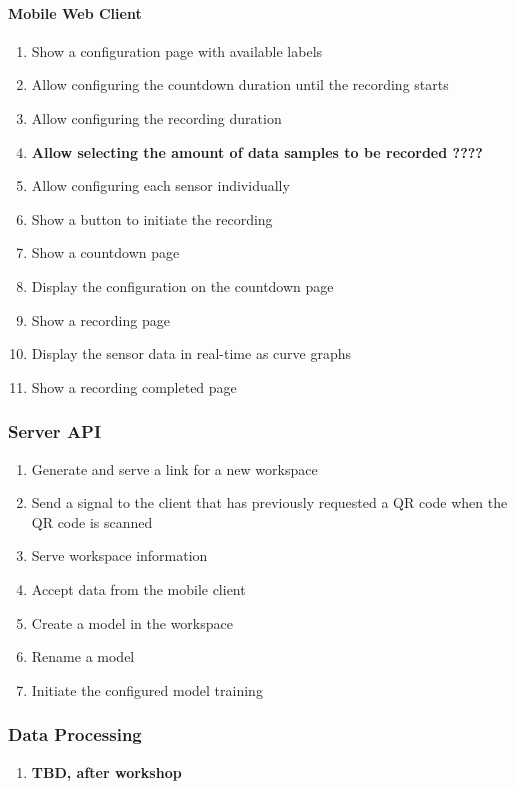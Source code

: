 \paragraph{Mobile Web Client}
\begin{enumerate}[resume*]
    \item Show a configuration page with available labels
    \item Allow configuring the countdown duration until the recording starts
    \item Allow configuring the recording duration
    \item \textbf{Allow selecting the amount of data samples to be recorded ????} %
    \item Allow configuring each sensor individually
    \item Show a button to initiate the recording
    \item Show a countdown page
    \item Display the configuration on the countdown page
    \item Show a recording page
    \item Display the sensor data in real-time as curve graphs
    \item Show a recording completed page %
\end{enumerate}

\subsubsection{Server API}
\begin{enumerate}[resume*]
    \item Generate and serve a link for a new workspace
    \item Send a signal to the client that has previously requested a QR code when the QR code is scanned
    \item Serve workspace information
    \item Accept data from the mobile client
    \item Create a model in the workspace
    \item Rename a model
    \item Initiate the configured model training
\end{enumerate}

\subsubsection{Data Processing}
\begin{enumerate}[resume*]
    \item \textbf{TBD, after workshop}
\end{enumerate}

